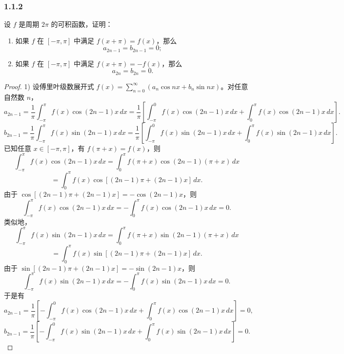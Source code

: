\documentclass[12pt]{ctexart}
\begin{document}
\subsubsection*{1.1.2}
设 $f$ 是周期 $2\pi$ 的可积函数，证明：

\begin{enumerate}
    \item 如果 $f$ 在 $[-\pi, \pi]$ 中满足 $f(x + \pi) = f(x)$，那么
    \[
    a_{2n-1} = b_{2n-1} = 0;
    \]

    \item 如果 $f$ 在 $[-\pi, \pi]$ 中满足 $f(x + \pi) = -f(x)$，那么
    \[
    a_{2n} = b_{2n} = 0.
    \]
\end{enumerate}

\begin{proof}
1) 设傅里叶级数展开式 $f(x) = \sum_{n=0}^\infty \left(a_n \cos nx + b_n \sin nx\right)$。对任意自然数 $n$，
\[
a_{2n-1} = \frac{1}{\pi} \int_{-\pi}^\pi f(x) \cos(2n-1)x \, dx
= \frac{1}{\pi} \left[ \int_{-\pi}^0 f(x) \cos(2n-1)x \, dx + \int_0^\pi f(x) \cos(2n-1)x \, dx \right].
\]
\[
b_{2n-1} = \frac{1}{\pi} \int_{-\pi}^\pi f(x) \sin(2n-1)x \, dx
= \frac{1}{\pi} \left[ \int_{-\pi}^0 f(x) \sin(2n-1)x \, dx + \int_0^\pi f(x) \sin(2n-1)x \, dx \right].
\]
已知任意 $x \in [-\pi, \pi]$，有 $f(\pi + x) = f(x)$，则
\[
\int_{-\pi}^\pi f(x) \cos(2n-1)x \, dx = \int_0^\pi f(\pi + x) \cos(2n-1)(\pi + x) \, dx \]
\[
= \int_0^\pi f(x) \cos\left[(2n-1)\pi + (2n-1)x\right] \, dx.
\]
由于 $\cos\left[(2n-1)\pi + (2n-1)x\right] = -\cos(2n-1)x$，则
\[
\int_{-\pi}^\pi f(x) \cos(2n-1)x \, dx = -\int_0^\pi f(x) \cos(2n-1)x \, dx = 0.
\]
类似地，
\[
\int_{-\pi}^\pi f(x) \sin(2n-1)x \, dx = \int_0^\pi f(\pi + x) \sin(2n-1)(\pi + x) \, dx\]
\[
= \int_0^\pi f(x) \sin\left[(2n-1)\pi + (2n-1)x\right] \, dx.
\]
由于 $\sin\left[(2n-1)\pi + (2n-1)x\right] = -\sin(2n-1)x$，则
\[
\int_{-\pi}^\pi f(x) \sin(2n-1)x \, dx = -\int_0^\pi f(x) \sin(2n-1)x \, dx = 0.
\]
于是有
\[
a_{2n-1} = \frac{1}{\pi} \left[ -\int_{-\pi}^0 f(x) \cos(2n-1)x \, dx + \int_0^\pi f(x) \cos(2n-1)x \, dx \right] = 0,
\]
\[
b_{2n-1} = \frac{1}{\pi} \left[ -\int_{-\pi}^0 f(x) \sin(2n-1)x \, dx + \int_0^\pi f(x) \sin(2n-1)x \, dx \right] = 0.
\]
\end{proof}
\end{document}
